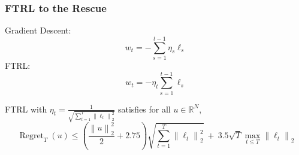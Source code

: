 \documentclass[usenames,dvipsnames]{beamer}
\DeclareMathOperator{\Regret}{Regret}
\newcommand{\R}{\mathbb{R}}
\newcommand{\norm}[1]{\left\|#1\right\|}
\begin{document}
\begin{frame}
\frametitle{FTRL to the Rescue}

Gradient Descent:
$$
w_t = - \sum_{s=1}^{t-1} \eta_s \ell_s
$$
FTRL:
$$
w_t = - \eta_t \sum_{s=1}^{t-1} \ell_s
$$

\begin{theorem}[Orabona-P. '15]
FTRL with $\eta_t = \frac{1}{\sqrt{\sum_{t=1}^T \norm{\ell_t}_2^2}}$
satisfies for all $u \in \R^N$,
$$
\Regret_T(u) \le \left(\frac{\norm{u}_2^2}{2} + 2.75 \right) \sqrt{\sum_{t=1}^T \norm{\ell_t}_2^2} \ + \ 3.5 \sqrt{T} \max_{t \le T} \norm{\ell_t}_2
$$
\end{theorem}

\end{frame}
\end{document}
